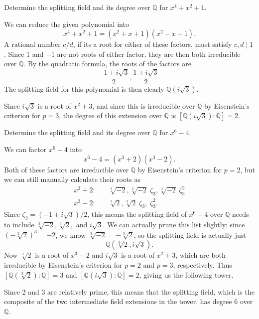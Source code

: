 \documentclass[10pt]{report}
\begin{document}
\newpage
\begin{exer}[DF 13.4: 3]
	Determine the splitting field and its degree over $\mathbb{Q}$ for $x^4+x^2+1$.
\end{exer}
We can reduce the given polynomial into
\[
	x^4+x^2+1 = (x^2+x+1)(x^2-x+1).
\] A rational number $c/d$, if its a root for either of these factors, must satisfy $c,d \;|\; 1$. Since $1$ and $-1$ are not roots of either factor, they are then both irreducible over $\mathbb{Q}$. By the quadratic formula, the roots of the factors are
\[
\frac{-1\pm i\sqrt{3} }{2} , \frac{1\pm i\sqrt{3} }{2} .
\] The splitting field for this polynomial is then clearly $\mathbb{Q}(i\sqrt{3} )$.

Since $i\sqrt{3} $ is a root of $x^2+3$, and since this is irreducible over $\mathbb{Q}$ by Eisenstein's criterion for $p=3$, the degree of this extension over $\mathbb{Q}$ is $[\mathbb{Q}(i\sqrt{3} ):\mathbb{Q}]=2$.

\begin{exer}[DF 13.4: 4]
	Determine the splitting field and its degree over $\mathbb{Q}$ for $x^6- 4$.
\end{exer}
We can factor $x^6-4$ into
\[
	x^6-4 = (x^3+2)(x^3-2).
\] Both of these factors are irreducible over $\mathbb{Q}$ by Eisenstein's criterion for $p=2$, but we can still manually calculate their roots as
\begin{align*}
	x^3 + 2: &\quad \sqrt[3]{-2}, \sqrt[3]{-2}\;\zeta_3, \sqrt[3]{-2}\;\zeta_3^2 \\
	x^3-2: &\quad \sqrt[3]{2}, \sqrt[3]{2}\;\zeta_3, \;\zeta_3^2.
\end{align*}
Since $\zeta_3 = (-1 +i\sqrt{3})/2 $, this means the splitting field of $x^6-4$ over $\mathbb{Q}$ needs to include $\sqrt[3]{-2} , \sqrt[3]{2} ,$ and $i\sqrt{3} $. We can actually prune this list slightly: since $\left( -\sqrt[3]{2}  \right)^3 = -2$, we know $\sqrt[3]{-2} =-\sqrt[3]{2} $, so the splitting field is actually just
\[
	\mathbb{Q}(\sqrt[3]{2} , i\sqrt{3} ).
\] 
Now $\sqrt[3]{2} $ is a root of $x^3-2$ and $i\sqrt{3} $ is a root of $x^2+3$, which are both irreducible by Eisenstein's criterion for $p=2$ and $p=3$, respectively. Thus $[\mathbb{Q}(\sqrt[3]{2} ):\mathbb{Q}]=3$ and $[\mathbb{Q}(i\sqrt{3} ):\mathbb{Q}]=2$, giving us the following tower.
\begin{center}
\end{center}
Since 2 and 3 are relatively prime, this means that the splitting field, which is the composite of the two intermediate field extensions in the tower, has degree 6 over $\mathbb{Q}$.
\end{document}
